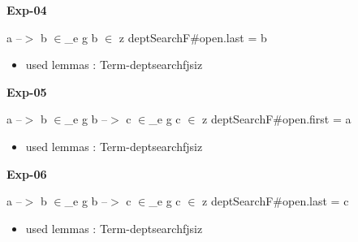 \documentclass[a4paper]{article}
\begin{document}
\medskip

\bigskip

{\large\bf Exp-04}

\medskip

 \Fol a --$>$ b $\in$\_e g \And b $\in$ z \Imp \Do deptSearchF\#\Dc open.last = b

\begin{itemize}


\item       used lemmas  : Term-deptsearchfjsiz

\end{itemize}

\medskip

\bigskip

{\large\bf Exp-05}

\medskip

 \Fol a --$>$ b $\in$\_e g \And b --$>$ c $\in$\_e g \And c $\in$ z \Imp \Do deptSearchF\#\Dc open.first = a

\begin{itemize}


\item       used lemmas  : Term-deptsearchfjsiz

\end{itemize}

\medskip

\bigskip

{\large\bf Exp-06}

\medskip

 \Fol a --$>$ b $\in$\_e g \And b --$>$ c $\in$\_e g \And c $\in$ z \Imp \Do deptSearchF\#\Dc open.last = c

\begin{itemize}


\item       used lemmas  : Term-deptsearchfjsiz

\end{itemize}

\medskip
\end{document}
